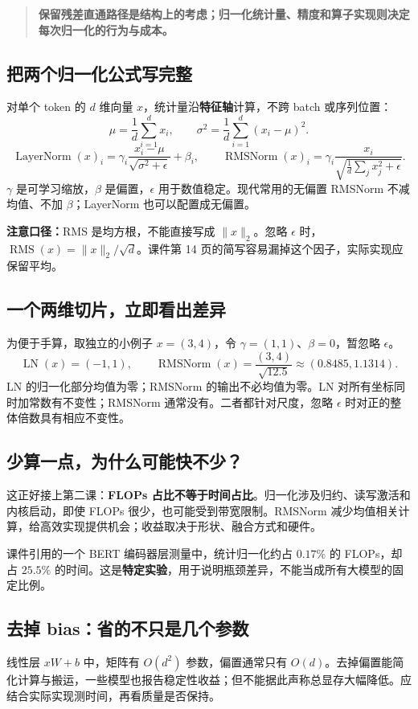 \documentclass[UTF8,fontset=fandol,zihao=-4,a4paper]{ctexart}
\newcommand{\focus}[1]{\begin{quote}\small\color{accent}\bfseries #1\end{quote}}
\newcommand{\nextpage}{\clearpage}
\begin{document}
\focus{保留残差直通路径是结构上的考虑；归一化统计量、精度和算子实现则决定每次归一化的行为与成本。}

\nextpage
\subsection{把两个归一化公式写完整}
对单个 token 的 $d$ 维向量 $x$，统计量沿\textbf{特征轴}计算，不跨 batch 或序列位置：
\[
\mu=\frac1d\sum_{i=1}^{d}x_i,\qquad
\sigma^2=\frac1d\sum_{i=1}^{d}(x_i-\mu)^2.
\]
\[
\operatorname{LayerNorm}(x)_i
=\gamma_i\frac{x_i-\mu}{\sqrt{\sigma^2+\epsilon}}+\beta_i,
\qquad
\operatorname{RMSNorm}(x)_i
=\gamma_i\frac{x_i}{\sqrt{\frac1d\sum_jx_j^2+\epsilon}}.
\]
$\gamma$ 是可学习缩放，$\beta$ 是偏置，$\epsilon$ 用于数值稳定。现代常用的无偏置 RMSNorm 不减均值、不加 $\beta$；LayerNorm 也可以配置成无偏置。

\textbf{注意口径：}RMS 是均方根，不能直接写成 $\|x\|_2$。忽略 $\epsilon$ 时，$\operatorname{RMS}(x)=\|x\|_2/\sqrt d$。课件第 14 页的简写容易漏掉这个因子，实际实现应保留平均。

\subsection{一个两维切片，立即看出差异}
为便于手算，取独立的小例子 $x=(3,4)$，令 $\gamma=(1,1)$、$\beta=0$，暂忽略 $\epsilon$。
\[
\operatorname{LN}(x)=(-1,1),\qquad
\operatorname{RMSNorm}(x)=\frac{(3,4)}{\sqrt{12.5}}
\approx(0.8485,1.1314).
\]
LN 的归一化部分均值为零；RMSNorm 的输出不必均值为零。LN 对所有坐标同时加常数有不变性；RMSNorm 通常没有。二者都针对尺度，忽略 $\epsilon$ 时对正的整体倍数具有相应不变性。

\subsection{少算一点，为什么可能快不少？}
这正好接上第二课：\textbf{FLOPs 占比不等于时间占比}。归一化涉及归约、读写激活和内核启动，即使 FLOPs 很少，也可能受到带宽限制。RMSNorm 减少均值相关计算，给高效实现提供机会；收益取决于形状、融合方式和硬件。

课件引用的一个 BERT 编码器层测量中，统计归一化约占 $0.17\%$ 的 FLOPs，却占 $25.5\%$ 的时间。这是\textbf{特定实验}，用于说明瓶颈差异，不能当成所有大模型的固定比例。

\subsection{去掉 bias：省的不只是几个参数}
线性层 $xW+b$ 中，矩阵有 $O(d^2)$ 参数，偏置通常只有 $O(d)$。去掉偏置能简化计算与搬运，一些模型也报告稳定性收益；但不能据此声称总显存大幅降低。应结合实际实现测时间，再看质量是否保持。
\end{document}
